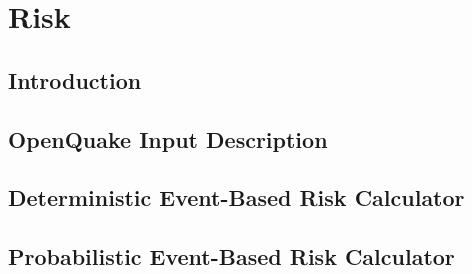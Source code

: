 \documentclass[11pt,a4paper,headings=small,dvips]{scrbook}
\begin{document}
\part{Risk}
\chapter{Introduction}
	\label{chap:intrisk}
	
\chapter{OpenQuake Input Description}
	\label{chap:riskinput}
	
\chapter{Deterministic Event-Based Risk Calculator}
	\label{chap:risk_deterministic}
	
\chapter{Probabilistic Event-Based Risk Calculator}
	\label{chap:risk_prob_event_based}
	
\end{document}
